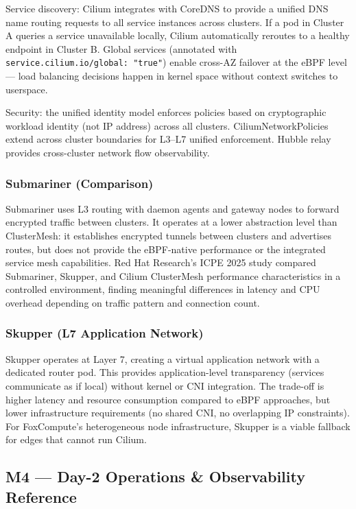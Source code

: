 \documentclass[11pt,letterpaper]{article}
\begin{document}
Service discovery: Cilium integrates with CoreDNS to provide a unified DNS name routing requests to all service instances across clusters. If a pod in Cluster A queries a service unavailable locally, Cilium automatically reroutes to a healthy endpoint in Cluster B. Global services (annotated with \texttt{service.cilium.io/global: "true"}) enable cross-AZ failover at the eBPF level --- load balancing decisions happen in kernel space without context switches to userspace.

Security: the unified identity model enforces policies based on cryptographic workload identity (not IP address) across all clusters. CiliumNetworkPolicies extend across cluster boundaries for L3--L7 unified enforcement. Hubble relay provides cross-cluster network flow observability.

\subsubsection{Submariner (Comparison)}

Submariner uses L3 routing with daemon agents and gateway nodes to forward encrypted traffic between clusters. It operates at a lower abstraction level than ClusterMesh: it establishes encrypted tunnels between clusters and advertises routes, but does not provide the eBPF-native performance or the integrated service mesh capabilities. Red Hat Research's ICPE 2025 study compared Submariner, Skupper, and Cilium ClusterMesh performance characteristics in a controlled environment, finding meaningful differences in latency and CPU overhead depending on traffic pattern and connection count.

\subsubsection{Skupper (L7 Application Network)}

Skupper operates at Layer 7, creating a virtual application network with a dedicated router pod. This provides application-level transparency (services communicate as if local) without kernel or CNI integration. The trade-off is higher latency and resource consumption compared to eBPF approaches, but lower infrastructure requirements (no shared CNI, no overlapping IP constraints). For FoxCompute's heterogeneous node infrastructure, Skupper is a viable fallback for edges that cannot run Cilium.

\subsection{M4 --- Day-2 Operations \& Observability Reference}
\end{document}
